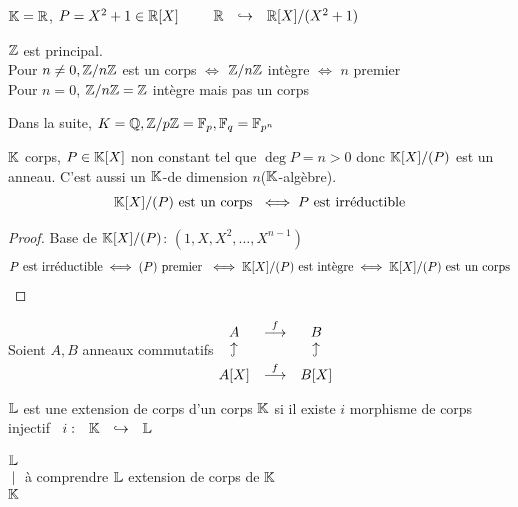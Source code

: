 \documentclass[]{report}
\begin{document}
    \begin{ex}{}{}
        $\mathbb{K}=\mathbb{R}$, $P=X^2+1\in \mathbb{R}[X]\qquad \begin{array}{ccccc} \mathbb{R} & \hookrightarrow & \mathbb{R}[X]/(X^2+1) \end{array}$
    \end{ex}

    \begin{re}{}{}
        $\mathbb{Z}$ est principal.\\
        Pour $n\neq 0,\mathbb{Z}/n\mathbb{Z}$ est un corps $\iff$ $\mathbb{Z}/n\mathbb{Z}$ intègre $\iff$ $n$ premier\\
        Pour $n=0$, $\mathbb{Z}/n\mathbb{Z}=\mathbb{Z}$ intègre mais pas un corps
    \end{re}

    Dans la suite, $K=\mathbb{Q},\mathbb{Z}/p\mathbb{Z}=\mathbb{F}_p,\mathbb{F}_q=\mathbb{F}_{p^n}$

    \begin{prop}{}{}
        $\mathbb{K}$ corps, $P\in \mathbb{K}[X]$ non constant tel que $\deg P=n>0$ donc $\mathbb{K}[X]/(P)$ est un anneau. C'est aussi un $\mathbb{K}$-\ev de dimension $n$($\mathbb{K}$-algèbre).
        \[\mathbb{K}[X]/(P)\text{ est un corps }\iff P\text{ est irréductible} \]
    \end{prop}

    \begin{proof}
        Base de $\mathbb{K}[X]/(P)$: $(1,X,X^2,\ldots,X^{n-1})$\\
        \[P\text{ est irréductible}\iff (P)\text{ premier }\iff \mathbb{K}[X]/(P)\text{ est intègre}\iff \mathbb{K}[X]/(P)\text{ est un corps}\]
    \end{proof}

    \begin{re}{}{}
        Soient $A,B$ anneaux commutatifs
        $\begin{matrix*}
            A& \overset{f}{\longrightarrow}& B\\
            \text{\rotatebox{90}{$\hookrightarrow$}}&&\text{\rotatebox{90}{$\hookrightarrow$}}\\
            A[X]&\overset{f}{\longrightarrow}&B[X]
        \end{matrix*}$
    \end{re}

    \begin{df}{}{}
        $\mathbb{L}$ est une extension de corps d'un corps $\mathbb{K}$ si il existe $i$ morphisme de corps injectif $\begin{array}{ccccc} i : & \mathbb{K} & \hookrightarrow & \mathbb{L} \end{array}$
    \end{df}

    \begin{nt}{}{}
        $\begin{matrix}
            \mathbb{L}\\
            |\\
            \mathbb{K}
        \end{matrix}$ à comprendre $\mathbb{L}$ extension de corps de $\mathbb{K}$
    \end{nt}
\end{document}
